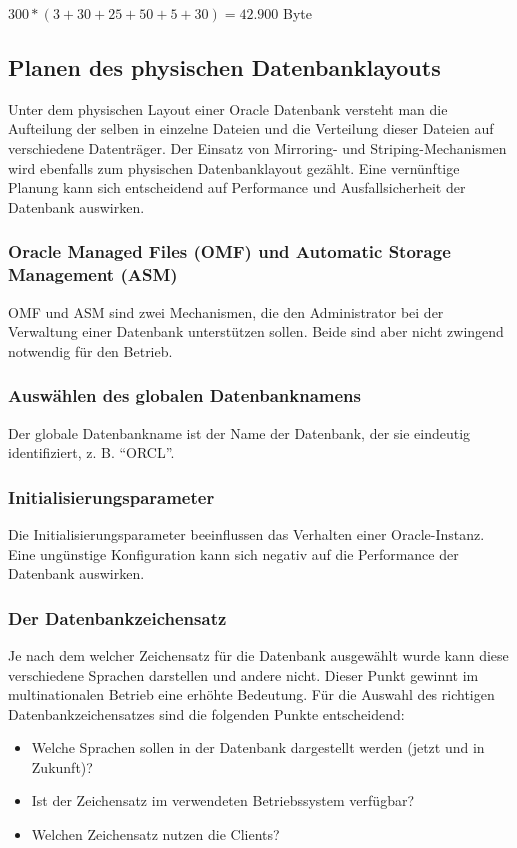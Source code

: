           \centerline{$300*(3+30+25+50+5+30)=42.900$ Byte}

      \subsection{Planen des physischen Datenbanklayouts}
        Unter dem physischen Layout einer Oracle Datenbank versteht man die Aufteilung der selben in einzelne Dateien und die Verteilung dieser Dateien auf verschiedene Datentr\"ager. Der Einsatz von Mirroring- und Striping-Mechanismen wird ebenfalls zum physischen Datenbanklayout gez\"ahlt. Eine vern\"unftige Planung kann sich entscheidend auf Performance und Ausfallsicherheit der Datenbank auswirken.
        \subsubsection{Oracle Managed Files (OMF) und Automatic Storage Management (ASM)}
          OMF und ASM sind zwei Mechanismen, die den Administrator bei der Verwaltung einer Datenbank unterst\"utzen sollen. Beide sind aber nicht zwingend notwendig f\"ur den Betrieb.
        \subsubsection{Ausw\"ahlen des globalen Datenbanknamens}
          Der globale Datenbankname ist der Name der Datenbank, der sie eindeutig identifiziert, z. B. \enquote{ORCL}.
        \subsubsection{Initialisierungsparameter}
          Die Initialisierungsparameter beeinflussen das Verhalten einer Oracle-Instanz. Eine ung\"unstige Konfiguration kann sich negativ auf die Performance der Datenbank auswirken.
        \subsubsection{Der Datenbankzeichensatz}
          Je nach dem welcher Zeichensatz f\"ur die Datenbank ausgew\"ahlt wurde kann diese verschiedene Sprachen darstellen und andere nicht. Dieser Punkt gewinnt im multinationalen Betrieb eine erh\"ohte Bedeutung. F\"ur die Auswahl des richtigen Datenbankzeichensatzes sind die folgenden Punkte entscheidend:
          \begin{itemize}
            \item Welche Sprachen sollen in der Datenbank dargestellt werden (jetzt und in Zukunft)?
            \item Ist der Zeichensatz im verwendeten Betriebssystem verf\"ugbar?
            \item Welchen Zeichensatz nutzen die Clients?
          \end{itemize}

